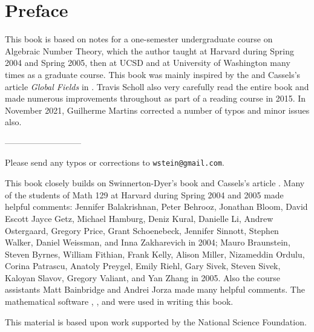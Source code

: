 \chapter*{Preface}

This book is based on notes for a one-semester
undergraduate course on Algebraic Number Theory, which the author
taught at Harvard during Spring 2004 and Spring 2005, then at UCSD
and at University of Washington many times as a graduate course.
This book was mainly inspired by the \cite[Ch.~1]{sd:brief} and
Cassels's article {\em Global Fields} in \cite{cassels:global}.
Travis Scholl also very carefully read the entire book and made
numerous improvements throughout as part of a
reading course in 2015. In November 2021, Guilherme Martins
corrected a number of typos and minor issues also.

\vspace{0.3in}
\begin{center}
---------------------------
\end{center}

\vspace{0.2in}
\noindent{}Please send any typos or corrections to {\tt wstein@gmail.com}.

\newpage
{} This book closely builds on
Swinnerton-Dyer's book \cite{sd:brief} and Cassels's article
\cite{cassels:global}. Many of the students of Math 129 at Harvard
during Spring 2004 and 2005 made helpful comments: Jennifer
Balakrishnan, Peter Behrooz, Jonathan Bloom, David Escott Jayce Getz,
Michael Hamburg, Deniz Kural, Danielle Li, Andrew Ostergaard, Gregory
Price, Grant Schoenebeck, Jennifer Sinnott, Stephen Walker, Daniel
Weissman, and Inna Zakharevich in 2004; Mauro Braunstein, Steven
Byrnes, William Fithian, Frank Kelly, Alison Miller, Nizameddin
Ordulu, Corina Patrascu, Anatoly Preygel, Emily Riehl, Gary Sivek,
Steven Sivek, Kaloyan Slavov, Gregory Valiant, and Yan Zhang in 2005.
Also the course assistants Matt Bainbridge and Andrei Jorza made many
helpful comments.  The mathematical software \cite{sage}, \cite{pari},
and \cite{magma} were used in writing this book.

\vspace{5ex}
\noindent{}This material is based upon work supported by the National Science
Foundation.




